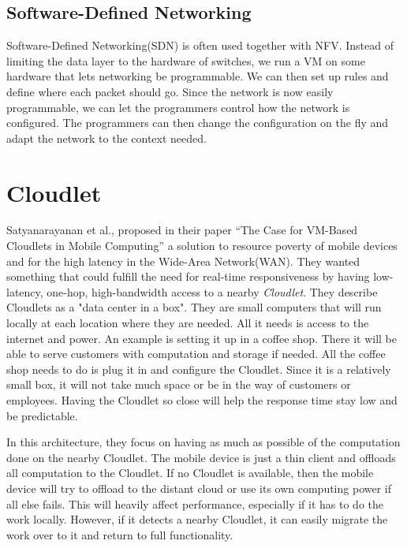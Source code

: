 \subsection{Software-Defined Networking}
Software-Defined Networking(SDN) is often used together with NFV. Instead of limiting the data layer to the hardware of switches, we run a VM on some hardware that lets networking be programmable. We can then set up rules and define where each packet should go. Since the network is now easily programmable, we can let the programmers control how the network is configured. The programmers can then change the configuration on the fly and adapt the network to the context needed.




\section{Cloudlet} \label{section:architecutres_cloudlet} 
Satyanarayanan et al., proposed in their paper “The Case for VM-Based Cloudlets in Mobile Computing”\cite{satyanarayanan_case_2009} a solution to resource poverty of mobile devices and for the high latency in the Wide-Area Network(WAN). They wanted something that could fulfill the need for real-time responsiveness by having low-latency, one-hop, high-bandwidth access to a nearby \textit{Cloudlet}. They describe Cloudlets as a "data center in a box"\cite{satyanarayanan_case_2009}. They are small computers that will run locally at each location where they are needed. All it needs is access to the internet and power. An example is setting it up in a coffee shop. There it will be able to serve customers with computation and storage if needed. All the coffee shop needs to do is plug it in and configure the Cloudlet. Since it is a relatively small box, it will not take much space or be in the way of customers or employees. Having the Cloudlet so close will help the response time stay low and be predictable.

In this architecture, they focus on having as much as possible of the computation done on the nearby Cloudlet. The mobile device is just a thin client and offloads all computation to the Cloudlet. If no Cloudlet is available, then the mobile device will try to offload to the distant cloud or use its own computing power if all else fails. This will heavily affect performance, especially if it has to do the work locally. However, if it detects a nearby Cloudlet, it can easily migrate the work over to it and return to full functionality.
 
